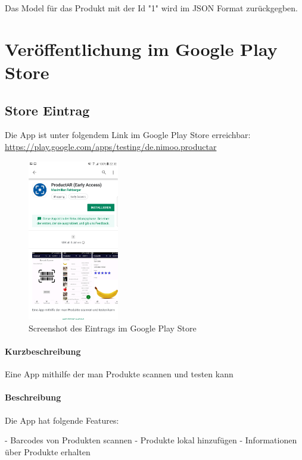 \documentclass{scrartcl}
\begin{document}
\noindent  Das Model für das Produkt mit der Id "1" wird im JSON Format zurückgegben.

\newpage

\section{Veröffentlichung im Google Play Store}

\subsection{Store Eintrag}

Die App ist unter folgendem Link im Google Play Store erreichbar: \newline \url{https://play.google.com/apps/testing/de.nimoo.productar}

\begin{figure}[h]
\centering
\includegraphics[width=150px]{img/store_screenshot.png}
\caption{Screenshot des Eintrags im Google Play Store}
\end{figure}

\paragraph{Kurzbeschreibung} \mbox{} \newline 
\noindent Eine App mithilfe der man Produkte scannen und testen kann 

\paragraph{Beschreibung} \mbox{} \newline 
\noindent Die App hat folgende Features: \newline 

\noindent - Barcodes von Produkten scannen \newline 
\noindent - Produkte lokal hinzufügen \newline 
\noindent - Informationen über Produkte erhalten \newline 
\end{document}
